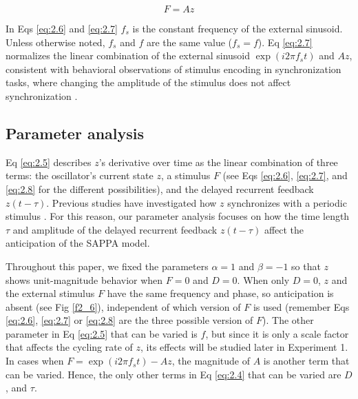 \documentclass{report}
\begin{document}
\begin{equation}
F = Az \label{eq:2.8}
\end{equation}

In Eqs \eqref{eq:2.6} and \eqref{eq:2.7} $f_s$ is the constant frequency of the external sinusoid. Unless otherwise noted, $f_s$ and $f$ are the same value ($f_s = f$). Eq \eqref{eq:2.7} normalizes the linear combination of the external sinusoid $\exp(i2\pi f_s t)$ and $Az$, consistent with behavioral observations of stimulus encoding in synchronization tasks, where changing the amplitude of the stimulus does not affect synchronization \cite{repp2008metrical}.

\subsection{Parameter analysis}

Eq \eqref{eq:2.5} describes $z$'s derivative over time as the linear combination of three terms: the oscillator's current state $z$, a stimulus $F$ (see Eqs \eqref{eq:2.6}, \eqref{eq:2.7}, and \eqref{eq:2.8} for the different possibilities), and the delayed recurrent feedback $z(t - \tau)$. Previous studies have investigated how $z$ synchronizes with a periodic stimulus \cite{kim2015signal, large2008resonating}. For this reason, our parameter analysis focuses on how the time length $\tau$ and amplitude of the delayed recurrent feedback $z(t - \tau)$ affect the anticipation of the SAPPA model.

Throughout this paper, we fixed the parameters $\alpha = 1$ and $\beta = -1$ so that $z$ shows unit-magnitude behavior when $F = 0$ and $D = 0$. When only $D = 0$, $z$ and the external stimulus $F$ have the same frequency and phase, so anticipation is absent (see Fig \ref{f2_6}), independent of which version of $F$ is used (remember Eqs \eqref{eq:2.6}, \eqref{eq:2.7} or \eqref{eq:2.8} are the three possible version of $F$). The other parameter in Eq \eqref{eq:2.5} that can be varied is $f$, but since it is only a scale factor that affects the cycling rate of $z$, its effects will be studied later in Experiment 1. In cases when $F = \exp(i2\pi f_s t)−Az$, the magnitude of $A$ is another term that can be varied. Hence, the only other terms in Eq \eqref{eq:2.4} that can be varied are $D$, and $\tau$.
\end{document}
